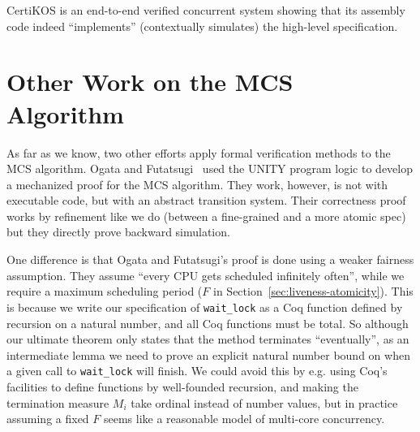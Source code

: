 CertiKOS is an end-to-end verified concurrent system showing that its
assembly code indeed ``implements'' (contextually simulates) the
high-level specification.


\section{Other Work on the MCS Algorithm}





As far as we know, two other efforts apply formal verification methods
to the MCS algorithm.  Ogata and Futatsugi~\cite{ogata:mcs-lock} used the UNITY program logic to 
develop a mechanized proof for the MCS algorithm.
They work, however, is not with executable code, but with an abstract transition system. 
Their correctness proof works by refinement like we do (between a fine-grained
and a more atomic spec) but they directly prove backward
simulation.

One difference is that Ogata and Futatsugi's proof is
done using a weaker fairness assumption. They assume ``every CPU gets
scheduled infinitely often'', while we require a maximum scheduling
period ($F$ in Section~\ref{sec:liveness-atomicity}).  This is because
we write our specification of \lstinline$wait_lock$ as a Coq function
defined by recursion on a natural number, and all Coq functions must
be total. So although our ultimate theorem only states that the method
terminates ``eventually'', as an intermediate lemma we need to prove
an explicit natural number bound on when a given call to
\lstinline$wait_lock$ will finish.  We could avoid this by e.g. using
Coq's facilities to define functions by well-founded recursion, and
making the termination measure $M_i$ take ordinal instead of number
values, but in practice assuming a fixed $F$ seems like a reasonable
model of multi-core concurrency.

